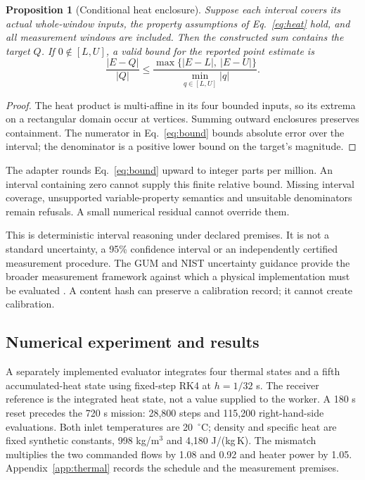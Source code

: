 \documentclass[11pt,a4paper]{article}
\newtheorem{proposition}{Proposition}
\begin{document}
\begin{proposition}[Conditional heat enclosure]\label{prop:enclosure}
Suppose each interval covers its actual whole-window inputs, the property assumptions of Eq.~\eqref{eq:heat} hold, and all measurement windows are included. Then the constructed sum contains the target \(Q\). If \(0\notin[L,U]\), a valid bound for the reported point estimate is
\begin{equation}
\frac{|E-Q|}{|Q|}
\leq
\frac{\max\{|E-L|,\ |E-U|\}}
{\min_{q\in[L,U]}|q|}.
\label{eq:bound}
\end{equation}
\end{proposition}
\begin{proof}
The heat product is multi-affine in its four bounded inputs, so its extrema on a rectangular domain occur at vertices. Summing outward enclosures preserves containment. The numerator in Eq.~\eqref{eq:bound} bounds absolute error over the interval; the denominator is a positive lower bound on the target's magnitude.
\end{proof}
The adapter rounds Eq.~\eqref{eq:bound} upward to integer parts per million. An interval containing zero cannot supply this finite relative bound. Missing interval coverage, unsupported variable-property semantics and unsuitable denominators remain refusals. A small numerical residual cannot override them.

This is deterministic interval reasoning under declared premises. It is not a standard uncertainty, a 95\% confidence interval or an independently certified measurement procedure. The GUM and NIST uncertainty guidance provide the broader measurement framework against which a physical implementation must be evaluated \cite{jcgm2008gum,taylor1994uncertainty}. A content hash can preserve a calibration record; it cannot create calibration.

\subsection{Numerical experiment and results}
A separately implemented evaluator integrates four thermal states and a fifth accumulated-heat state using fixed-step RK4 at \(h=1/32\) s. The receiver reference is the integrated heat state, not a value supplied to the worker. A 180 s reset precedes the 720 s mission: 28,800 steps and 115,200 right-hand-side evaluations. Both inlet temperatures are 20~\(^{\circ}\)C; density and specific heat are fixed synthetic constants, 998 kg/m\(^3\) and 4,180 J/(kg\,K). The mismatch multiplies the two commanded flows by 1.08 and 0.92 and heater power by 1.05. Appendix~\ref{app:thermal} records the schedule and the measurement premises.
\end{document}
